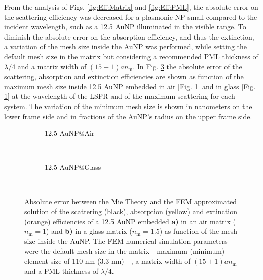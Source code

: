 From the analysis of Figs. \ref{fig:Eff:Matrix} and \ref{fig:Eff:PML}, the absolute error on the scattering efficiency was decreased for a plasmonic NP small compared to the incident wavelength, such as a 12.5 AuNP illuminated in the visible range. To diminish the absolute error on the absorption efficiency, and thus the extinction, a variation of the mesh size inside the AuNP was performed, while setting the default mesh size in the matrix but considering a recommended PML thickness of $\lambda/4$ and a matrix width of $(15+1)an_\text{m}$. In Fig. \ref{fig:Eff:rad} the absolute error of the scattering, absorption and extinction efficiencies are shown as function  of the maximum mesh size inside  12.5 AuNP embedded in air [Fig. \ref{fig:Eff:rad:a}] and in glass [Fig. \ref{fig:Eff:rad:a}] at the wavelength of the LSPR and of the maximum scattering for each system. The variation of the minimum mesh size is shown in nanometers on the lower frame side and  in fractions of the AuNP's radius on the upper frame side.

\begin{figure}[h!]
	\centering
	\def\svgwidth{.9\textwidth}
	\small
	\hspace*{-.45\textwidth}
	 \begin{subfigure}{\textwidth}\caption{12.5 AuNP$@$Air}\label{fig:Eff:rad:a}\end{subfigure}\\[5.5em]
		 \hspace*{-.45\textwidth}
	      \begin{subfigure}{\textwidth}\caption{12.5 AuNP$@$Glass}\label{fig:Eff:rad:b}\end{subfigure}\\[-10.1em]
\caption[Scattering, Absorption and Extinction Efficiencies absolute error: meshing size inside AuNP analysis ]{Absolute error between the Mie Theory and the FEM approximated solution of the scattering (black), absorption (yellow) and extinction (orange) efficiencies of a 12.5 AuNP embedded \textbf{a)} in an air matrix ($n_\text{m} = 1$) and \textbf{b)} in a glass matrix ($n_\text{m} = 1.5$) as function of the mesh size inside the AuNP. The FEM numerical simulation parameters were the default mesh size  in the matrix---maximum (minimum) element size of 110 nm (3.3 nm)---, a matrix width of $(15+1) a n_\text{m}$ and a PML thickness of $\lambda/4$.}
\label{fig:Eff:rad}
\end{figure}

